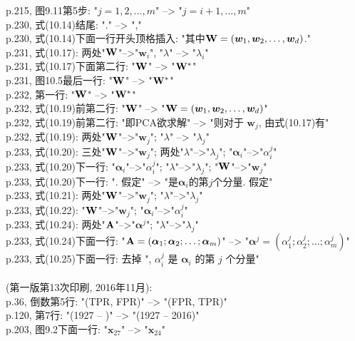 \documentclass[UTF8]{article}
\begin{document}
p.215, 图9.11第5步: "$j = 1, 2, \ldots, m$" --> "$j = i+1, \ldots, m$" \\
p.230, 式(10.14)结尾: "." --> "," \\
p.230, 式(10.14)下面一行开头顶格插入: "其中${\bf W} = (\bm{w}_1, \bm{w}_2, \ldots, \bm{w}_d)$." \\
p.231, 式(10.17): 两处"${\bf W}$"-->"${\bm w}_i$", "$\lambda$" --> "$\lambda_i$" \\
p.231, 式(10.17)下面第二行: "${\bf W}$" --> "${\bf W}^*$" \\
p.231, 图10.5最后一行: "${\bf W}$" --> "${\bf W}^*$" \\
p.232, 第一行: "${\bf W}$" --> "${\bf W}^*$" \\
p.232, 式(10.19)前第二行: "${\bf W}$" --> "${\bf W} = (\bm{w}_1, \bm{w}_2, \ldots, \bm{w}_d)$" \\
p.232, 式(10.19)前第二行: "即PCA欲求解" --> "则对于 $\bm{w}_j$, 由式(10.17)有" \\
p.232, 式(10.19): 两处"${\bf W}$"-->"${\bm w}_j$"; "$\lambda$" --> "$\lambda_j$" \\
p.233, 式(10.20): 三处"${\bf W}$"-->"${\bm w}_j$"; 两处"$\lambda$"-->"$\lambda_j$"; "${\bm \alpha}_i$"-->"$\alpha_i^j$" \\
p.233, 式(10.20)下一行: "${\bm \alpha}_i$"-->"$\alpha_i^j$"; "$\lambda$"-->"$\lambda_j$"; "${\bf W}$"-->"${\bm w}_j$" \\
p.233, 式(10.20)下一行: ". 假定" --> "是${\bm \alpha}_i$的第$j$个分量. 假定" \\
p.233, 式(10.21): 两处"${\bf W}$"-->"${\bm w}_j$"; "$\lambda$"-->"$\lambda_j$" \\
p.233, 式(10.22): "${\bf W}$"-->"${\bm w}_j$"; "${\bm \alpha}_i$"-->"$\alpha_i^j$" \\
p.233, 式(10.24): 两处"${\bf A}$"-->"${\bm \alpha}^j$"; "$\lambda$"-->"$\lambda_j$" \\
p.233, 式(10.24)下面一行: "${\bf A} = ({\bm \alpha}_1; {\bm \alpha}_2; \ldots; {\bm \alpha}_m)$" --> "${\bm \alpha}^j = (\alpha_1^j; \alpha_2^j; \ldots; \alpha_m^j)$" \\
p.233, 式(10.25)下面一行: 去掉 ", $\alpha_i^j$ 是 ${\bm \alpha}_i$ 的第 $j$ 个分量" \\
\\
(第一版第13次印刷, 2016年11月):
\\
p.36, 倒数第5行: "(TPR, FPR)" --> "(FPR, TPR)" \\
p.120, 第7行: "(1927 -- )" --> "(1927 -- 2016)" \\
p.203, 图9.2下面一行: "$\bm{x}_{27}$" --> "$\bm{x}_{24}$" \\
\end{document}
